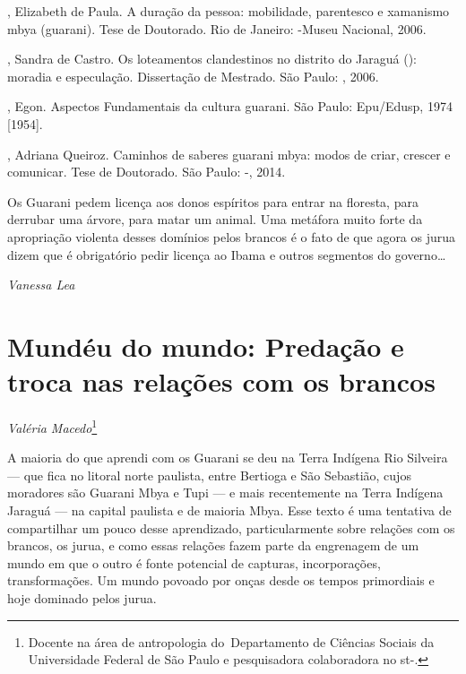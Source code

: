 \begin{Parskip}
, Elizabeth de Paula. A duração da pessoa: mobilidade,
parentesco e xamanismo mbya (guarani). Tese de Doutorado. Rio de
Janeiro: -Museu Nacional, 2006.  

, Sandra de Castro. Os loteamentos clandestinos no distrito do
Jaraguá (): moradia e especulação. Dissertação de Mestrado. São
Paulo: , 2006.

, Egon. Aspectos Fundamentais da cultura guarani. São Paulo:
Epu/Edusp, 1974 [1954].

, Adriana Queiroz. Caminhos de saberes guarani mbya: modos de
criar, crescer e comunicar. Tese de Doutorado. São Paulo: -,
2014.
\end{Parskip}

Os Guarani pedem licença aos donos espíritos para entrar na floresta,
para derrubar uma árvore, para matar um animal. Uma metáfora muito
forte da apropriação violenta desses domínios pelos brancos é o fato de
que agora os jurua dizem que é obrigatório pedir licença ao Ibama e
outros segmentos do governo\ldots{}
\medskip
\begin{flushright}
\emph{Vanessa Lea}
\end{flushright}

\chapter{Mundéu do mundo: Predação e troca nas relações com os brancos} 
\begin{flushright}
\emph{Valéria Macedo}\footnote{Docente na área de antropologia
do~Departamento de Ciências Sociais da Universidade Federal de São
Paulo e pesquisadora colaboradora no st-.}
\end{flushright}
\medskip

A maioria do que aprendi com os Guarani se deu na Terra Indígena Rio
Silveira --- que fica no litoral norte paulista, entre Bertioga e São
Sebastião, cujos moradores são Guarani Mbya e Tupi --- e mais
recentemente na Terra Indígena Jaraguá --- na capital paulista e de
maioria Mbya. Esse texto é uma tentativa de compartilhar um pouco desse
aprendizado, particularmente sobre relações com os brancos, os jurua, e
como essas relações fazem parte da engrenagem de um mundo em que o
outro é fonte potencial de capturas, incorporações, transformações. Um
mundo povoado por onças desde os tempos primordiais e hoje dominado
pelos jurua. 

